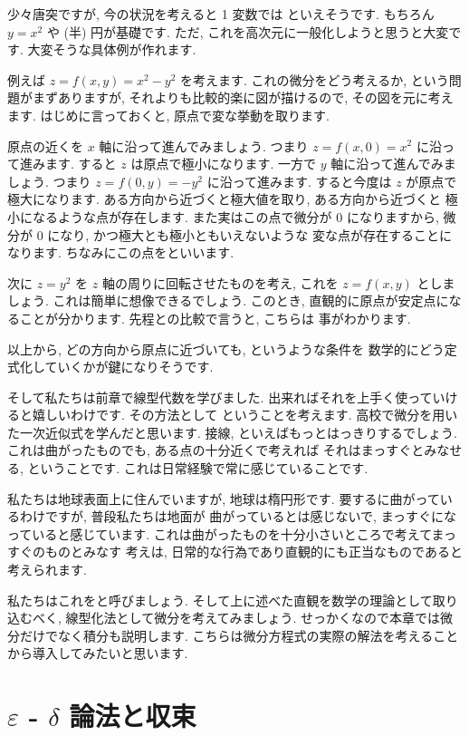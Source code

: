 \documentclass[openany, a4paper, oneside]{book}
\theoremstyle{break}
\theoremstyle{breakdefn}
\begin{document}
少々唐突ですが, 今の状況を考えると 1 変数では
といえそうです. もちろん $y=x^2$ や (半) 円が基礎です.
ただ, これを高次元に一般化しようと思うと大変です.
大変そうな具体例が作れます.

例えば $z=f (x,y)=x^2-y^2$ を考えます.
これの微分をどう考えるか, という問題がまずありますが,
それよりも比較的楽に図が描けるので, その図を元に考えます.
はじめに言っておくと, 原点で変な挙動を取ります.

原点の近くを $x$ 軸に沿って進んでみましょう.
つまり $z=f (x,0)=x^2$ に沿って進みます.
すると $z$ は原点で極小になります.
一方で $y$ 軸に沿って進んでみましょう.
つまり $z=f (0,y)=-y^2$ に沿って進みます.
すると今度は $z$ が原点で極大になります.
ある方向から近づくと極大値を取り, ある方向から近づくと
極小になるような点が存在します.
また実はこの点で微分が 0 になりますから,
微分が 0 になり, かつ極大とも極小ともいえないような
変な点が存在することになります.
ちなみにこの点をといいます.

次に $z=y^2$ を $z$ 軸の周りに回転させたものを考え,
これを $z=f (x,y)$ としましょう.
これは簡単に想像できるでしょう.
このとき, 直観的に原点が安定点になることが分かります.
先程との比較で言うと, こちらは
事がわかります.

以上から, どの方向から原点に近づいても, というような条件を
数学的にどう定式化していくかが鍵になりそうです.

そして私たちは前章で線型代数を学びました.
出来ればそれを上手く使っていけると嬉しいわけです.
その方法として
ということを考えます.
高校で微分を用いた一次近似式を学んだと思います.
接線, といえばもっとはっきりするでしょう.
これは曲がったものでも, ある点の十分近くで考えれば
それはまっすぐとみなせる, ということです.
これは日常経験で常に感じていることです.

私たちは地球表面上に住んでいますが, 地球は楕円形です.
要するに曲がっているわけですが, 普段私たちは地面が
曲がっているとは感じないで, まっすぐになっていると感じています.
これは曲がったものを十分小さいところで考えてまっすぐのものとみなす
考えは, 日常的な行為であり直観的にも正当なものであると考えられます.

私たちはこれをと呼びましょう.
そして上に述べた直観を数学の理論として取り込むべく,
線型化法として微分を考えてみましょう.
せっかくなので本章では微分だけでなく積分も説明します.
こちらは微分方程式の実際の解法を考えることから導入してみたいと思います.
\section{$\varepsilon$ - $\delta$ 論法と収束}
\label{sec-5-2-2}
\end{document}
